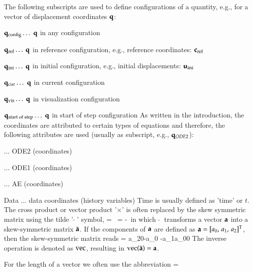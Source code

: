 %
The following subscripts are used to define configurations of a quantity, e.g., for a vector of displacement coordinates $\qv$:
\bi
  \item $\qv\cConfig \ldots$ $\qv$ in any configuration
  \item $\qv\cRef \ldots$ $\qv$ in reference configuration, e.g., reference coordinates: $\cv\cRef$
  \item $\qv\cIni \ldots$ $\qv$ in initial configuration, e.g., initial displacements: $\uv\cIni$
  \item $\qv\cCur \ldots$ $\qv$ in current configuration
  \item $\qv\cVis \ldots$ $\qv$ in visualization configuration
  \item $\qv\cSOS \ldots$ $\qv$ in start of step configuration
\ei
As written in the introduction, the coordinates are attributed to certain types of equations and therefore, the following attributes are used (usually as subscript, e.g., $\qv_{ODE2}$):
\bi
  \item {} $\ldots$ \acl{ODE2} (coordinates)
  \item {} $\ldots$ \acl{ODE1} (coordinates)
  \item {} $\ldots$ \acl{AE} (coordinates)
  \item Data $\ldots$ data coordinates (history variables)
\ei
Time is usually defined as 'time' or $t$.
The cross product or vector product '$\times$' is often replaced by the skew symmetric matrix using the tilde '$\tilde{\;\;}$' symbol,
\be
  \av \times \bv = \tilde \av \, \bv = -\tilde \bv \, \av \eqComma
\ee
in which $\tilde{\;\;}$ transforms a vector $\av$ into a skew-symmetric matrix $\tilde \av$.
If the components of $\av$ are defined as $\av = \vrRow{a_0}{a_1}{a_2}\tp$, then the skew-symmetric matrix reads
\be
  \tilde \av =  {a_2}{0}{-a_0} {-a_1}{a_0}{0} \eqDot
\ee
The inverse operation is denoted as $\vec$, resulting in $\vec(\tilde \av) = \av$.

For the length of a vector we often use the abbreviation 
\be \label{eq:definition:length}
  \Vert \av \Vert =  \eqDot
\ee

